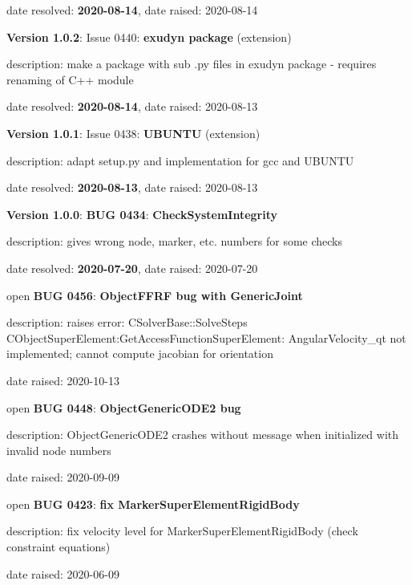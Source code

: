   \item   date resolved: {\bf 2020-08-14},
date raised: 2020-08-14   \ei
  \item {\bf Version 1.0.2}: \vspace{-6pt} 
  Issue 0440: {\bf exudyn package}
(extension)
  \bi
  \item {\small description: make a package with sub .py files in exudyn package - requires renaming of C++ module}
  \item   date resolved: {\bf 2020-08-14},
date raised: 2020-08-13   \ei
  \item {\bf Version 1.0.1}: \vspace{-6pt} 
  Issue 0438: {\bf UBUNTU}
(extension)
  \bi
  \item {\small description: adapt setup.py and implementation for gcc and UBUNTU}
  \item   date resolved: {\bf 2020-08-13},
date raised: 2020-08-13   \ei
  \item {\bf Version 1.0.0}: \vspace{-6pt} 
{\bf \color{warningRed}  BUG 0434}: {\bf CheckSystemIntegrity}
  \bi
  \item {\small description: gives wrong node, marker, etc. numbers for some checks}
  \item   date resolved: {\bf 2020-07-20},
date raised: 2020-07-20   \ei
\ei
{}
\bi
  \item open {\bf BUG 0456}:  {\bf ObjectFFRF bug with GenericJoint}
  \bi
  \item {\small description: raises error: CSolverBase::SolveSteps CObjectSuperElement:GetAccessFunctionSuperElement: AngularVelocity\_qt not implemented; cannot compute jacobian for orientation}
  \item date raised: 2020-10-13   \ei
  \item open {\bf BUG 0448}:  {\bf ObjectGenericODE2 bug}
  \bi
  \item {\small description: ObjectGenericODE2 crashes without message when initialized with invalid node numbers}
  \item date raised: 2020-09-09   \ei
  \item open {\bf BUG 0423}:  {\bf fix MarkerSuperElementRigidBody}
  \bi
  \item {\small description: fix velocity level for MarkerSuperElementRigidBody (check constraint equations)}
  \item date raised: 2020-06-09   \ei
\ei
